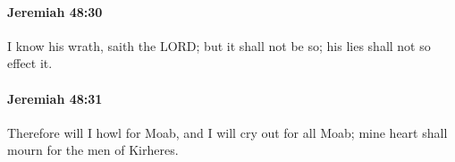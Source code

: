 		\paragraph{Jeremiah 48:30} %
			\label{JEREMIAH-48-30}

			I know his wrath, saith the LORD; but it shall not be so; his lies shall not so effect it.


		\paragraph{Jeremiah 48:31} %
			\label{JEREMIAH-48-31}

			Therefore will I howl for Moab, and I will cry out for all Moab; mine heart shall mourn for the men of Kirheres.


